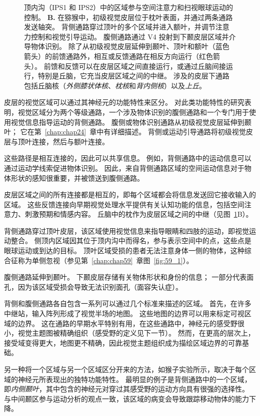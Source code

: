 \begin{figure}[htbp]
{		顶内沟（IPS1 和 IPS2）中的区域参与空间注意力和扫视眼球运动的控制。
		\textbf{B.} 在猕猴中，初级视觉皮层位于枕叶表面，并通过两条通路发送轴突。
		背侧通路穿过顶叶的多个区域并进入额叶，并调节注意力控制和视觉引导运动。
		腹侧通路通过 V4 投射到下颞皮层区域并介导物体识别。
		除了从初级视觉皮层延伸到颞叶、顶叶和额叶（蓝色箭头）的前馈通路外，相互或反馈通路在相反方向运行（红色箭头）。
		前馈和反馈可以在皮层区域之间直接运行，或通过丘脑间接运行，特别是丘脑，它充当皮层区域之间的中继。 
		涉及的皮层下通路包括丘脑核（\textit{外侧膝状体核}、\textit{枕核}和\textit{背内侧核}）以及\textit{上丘}。}
	\label{fig:21_7}
\end{figure}


皮层的视觉区域可以通过其神经元的功能特性来区分。
对此类功能特性的研究表明，视觉区域分为两个等级通路，一个涉及物体识别的腹侧通路和一个专门用于使用视觉信息指导运动的背侧通路。
腹侧或物体识别通路从初级视觉皮层延伸到颞叶；
它在第~\ref{chap:chap24}~章中有详细描述。
背侧或运动引导通路将初级视觉皮层与顶叶连接，然后与额叶连接。


这些路径是相互连接的，因此可以共享信息。
例如，背侧通路中的运动信息可以通过运动学线索促进物体识别。
因此，来自背侧通路区域的空间运动信息对于物体形状的感知很重要，并被馈送到腹侧通路。


皮层区域之间的所有连接都是相互的，即每个区域都会将信息发送回它接收输入的区域。
这些反馈连接向早期视觉处理水平提供有关认知功能的信息，包括空间注意力、刺激预期和情感内容。
丘脑中的枕作为皮层区域之间的中继（见图~\ref{fig:21_7}B）。


背侧通路穿过顶叶皮层，该区域使用视觉信息来指导眼睛和四肢的运动，即视觉运动整合。
侧顶内区域因其位于顶内沟中而得名，参与表示空间中的点，这些点是眼球运动或到达的目标。
顶叶区域受损的患者无法注意身体一侧的物体，这种综合征称为单侧忽视（参见第~\ref{chap:chap59}~章图~\ref{fig:59_1}）。


腹侧通路延伸到颞叶。
下颞皮层存储有关物体形状和身份的信息；
一部分代表面孔，因为该区域受损会导致无法识别面孔（面容失认症）。


背侧和腹侧通路各自包含一系列可以通过几个标准来描述的区域。
首先，在许多中继站，输入阵列形成了视觉半场的地图。 
这些地图的边界可以用来标定可视区域的边界。
这在通路的早期水平特别有用，在这些通路中，神经元的感受野很小，视觉主题图被精确组织（感受野的定义见下一节）。
然而，在更高的层次上，接受域变得更大，地图更不精确，因此视觉主题组织成为描绘区域边界的可靠基础。


另一种将一个区域与另一个区域区分开来的方法，如猴子实验所示，取决于每个区域的神经元所表现出的独特功能特性。
最明显的例子是背侧通路中的一个区域，即\textit{内侧颞叶}，其中包含的神经元对穿过其感受野的运动方向具有很强的选择性。
与中间颞区参与运动分析的观点一致，该区域的病变会导致跟踪移动物体的能力下降。


